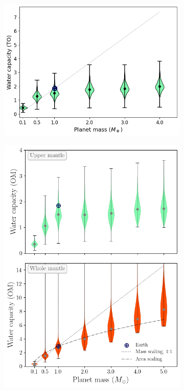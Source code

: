 \documentclass[linenumbers]{aastex631}
\begin{document}
\begin{figure}
\centering
\begin{subfigure}[b]{.5\textwidth}
  \centering
  \includegraphics[width=\linewidth]{viol-Mp_w_um.png}
  \caption{}
  \label{fig:violin_um}
\end{subfigure}
\hfill
\begin{subfigure}[b]{.5\textwidth}
  \centering
  \includegraphics[width=\linewidth]{viol-Mp_w_tot.png}

\end{subfigure}
\end{figure}
\end{document}
